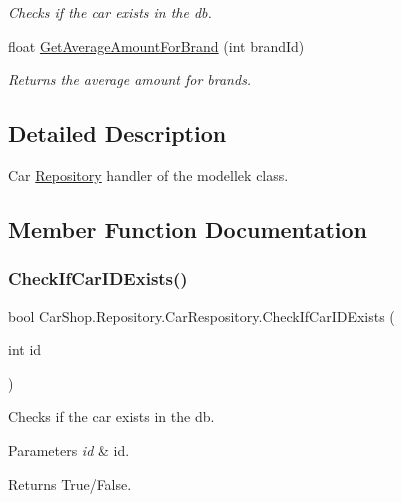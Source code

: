 \begin{DoxyCompactItemize}
\begin{DoxyCompactList}\small\item\em Checks if the car exists in the db. \end{DoxyCompactList}\item 
float \mbox{\hyperlink{class_car_shop_1_1_repository_1_1_car_respository_a14999d3c1d04ef49d6ce0073ba249497}{Get\+Average\+Amount\+For\+Brand}} (int brand\+Id)
\begin{DoxyCompactList}\small\item\em Returns the average amount for brands. \end{DoxyCompactList}\end{DoxyCompactItemize}


\subsection{Detailed Description}
Car \mbox{\hyperlink{namespace_car_shop_1_1_repository}{Repository}} handler of the modellek class. 



\subsection{Member Function Documentation}
\mbox{\label{class_car_shop_1_1_repository_1_1_car_respository_afc83ebf123476021e0ab66458b12d18a}} 
\subsubsection{\texorpdfstring{Check\+If\+Car\+I\+D\+Exists()}{CheckIfCarIDExists()}}
{\footnotesize\ttfamily bool Car\+Shop.\+Repository.\+Car\+Respository.\+Check\+If\+Car\+I\+D\+Exists (\begin{DoxyParamCaption}\item[{int}]{id }\end{DoxyParamCaption})}



Checks if the car exists in the db. 


\begin{DoxyParams}{Parameters}
{\em id} & id.\\
\hline
\end{DoxyParams}
\begin{DoxyReturn}{Returns}
True/\+False.
\end{DoxyReturn}
\mbox{\label{class_car_shop_1_1_repository_1_1_car_respository_a79be7e5b4f1a0086039888ad4596cd6c}} 
